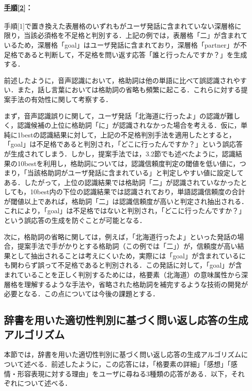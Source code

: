 \documentclass[japanese]{jnlp_1.4}
\begin{document}
 \paragraph{\underline{手順[2]}：}手順[1]で置き換えた表層格のいずれもがユーザ発話に含まれていない深層格に限り，当該必須格を不足格と判別する．上記の例では，表層格「二」が含まれているため，深層格「goal」はユーザ発話に含まれており，深層格「partner」が不足格であると判断して，不足格を問い返す応答「誰と行ったんですか？」を生成する．

前述したように，音声認識において，格助詞は他の単語に比べて誤認識されやすい．また，話し言葉においては格助詞の省略も頻繁に起こる．これらに対する提案手法の有効性に関して考察する．

まず，音声認識誤りに関して，ユーザ発話「北海道に行ったよ」の認識が難しく，認識候補の上位に格助詞「に」が認識されなかった場合を考える．仮に，単純に1bestの認識結果に対して，上記の不足格判別手法を適用したとすると，「goal」は不足格であると判別され，「どこに行ったんですか？」という誤応答が生成されてしまう．しかし，提案手法では，3.2節でも述べたように，認識結果の10bestを利用し，格助詞については，認識信頼度判定の閾値を低い値に，つまり，「当該格助詞がユーザ発話に含まれている」と判定しやすい値に設定してある．したがって，上位の認識結果では格助詞「二」が認識されていなかったとしても，10best内の下位の認識結果では認識されており，単語認識信頼度の合計が閾値以上であれば，格助詞「二」は認識信頼度が高いと判定され抽出される．これにより，「goal」は不足格ではないと判別され，「どこに行ったんですか？」という誤応答の生成を防ぐことが可能となる．

次に，格助詞の省略に関しては，例えば，「北海道行ったよ」といった発話の場合，提案手法で手がかりとする格助詞（この例では「二」）が，信頼度が高い結果として抽出されることは考えにくいため，実際には「goal」が含まれているにも関わらず誤って不足格であると判別される．この発話に対して，「goal」が含まれていることを正しく判別するためには，格要素（北海道）の意味属性から深層格を理解するような手法や，省略された格助詞を補完するような技術の開発が必要となる．この点については今後の課題とする．

 
 
\subsection{辞書を用いた適切性判別に基づく問い返し応答の生成アルゴリズム}

本節では，辞書を用いた適切性判別に基づく問い返し応答の生成アルゴリズムについて述べる．前述したように，この応答には，「格要素の詳細」「感想」「感情・形容表現に対する理由」をユーザに尋ねる3種類の応答がある．以下，それぞれについて述べる．
 
\end{document}
